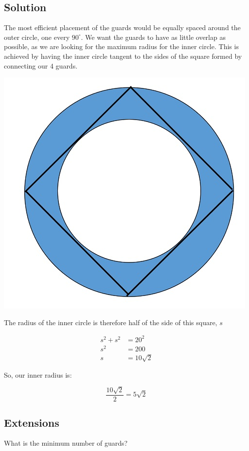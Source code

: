 \documentclass{book}
\begin{document}
\subsection{Solution}
The most efficient placement of the guards would be equally spaced around the outer circle, one every \(90^{\circ}\). We want the guards to have as little overlap as possible, as we are looking for the maximum radius for the inner circle. This is achieved by having the inner circle tangent to the sides of the square formed by connecting our 4 guards.

\begin{center}
\includegraphics{annulus2}
\end{center}

The radius of the inner circle is therefore half of the side of this square, \(s\)

\begin{align*}
  s^2+s^2&=20^2\\
  s^2&=200\\
  s&=10\sqrt{2}
\end{align*}


So, our inner radius is:

\[\frac{10\sqrt{2}}{2}=\boxed{5\sqrt{2}}\]
\subsection{Extensions}
What is the minimum number of guards?
\end{document}
